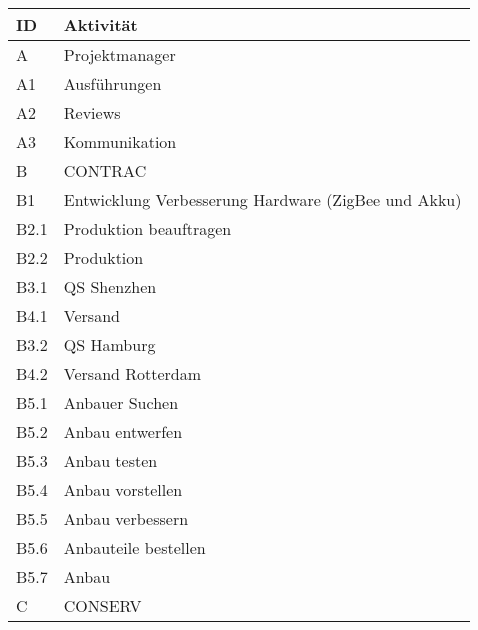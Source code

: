 \begin{table}[H]
    \renewcommand{\arraystretch}{1.05}
    \begin{center}
        \begin{tabular}{l|l}
            \hline
            \textbf{ID} & \textbf{Aktivität}\\\hline
            A    & Projektmanager                                      \\ \hline
            A1   & Ausführungen                                        \\ \hline
            A2   & Reviews                                             \\ \hline
            A3 & Kommunikation \\\hline
            B    & CONTRAC                                             \\ \hline
            B1   & Entwicklung Verbesserung Hardware (ZigBee und Akku) \\ \hline
            B2.1 & Produktion beauftragen                              \\ \hline
            B2.2 & Produktion                                          \\ \hline
            B3.1 & QS Shenzhen                                         \\ \hline
            B4.1 & Versand                                             \\ \hline
            B3.2 & QS Hamburg                                          \\ \hline
            B4.2 & Versand Rotterdam                                   \\ \hline
            B5.1 & Anbauer Suchen                                      \\ \hline
            B5.2 & Anbau entwerfen                                     \\ \hline
            B5.3 & Anbau testen                                        \\ \hline
            B5.4 & Anbau vorstellen                                    \\ \hline
            B5.5 & Anbau verbessern                                    \\ \hline
            B5.6 & Anbauteile bestellen                                \\ \hline
            B5.7 & Anbau                                               \\ \hline
            C    & CONSERV                                             \\ \hline

\end{tabular}
\end{center}
\end{table}
